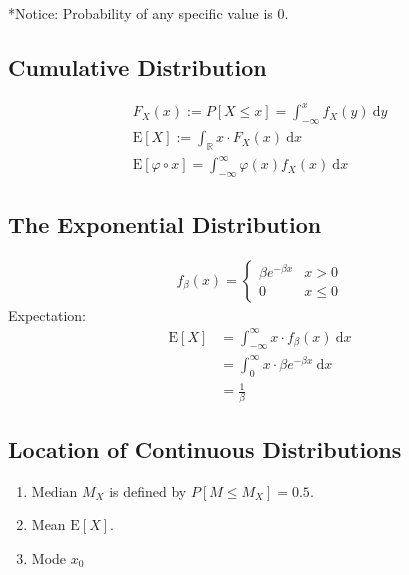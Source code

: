 \documentclass[11pt,a4paper]{article}
\newcommand{\dd}{\mathrm{d}}
\newcommand{\dx}{\dd x}
\newcommand{\dy}{\dd y}
\begin{document}
*Notice: Probability of any specific value is 0.
\subsection{Cumulative Distribution}
\begin{gather}
    F_X(x):=P[X\le x]=\int_{-\infty}^{x}f_X(y)\ \dy\\
    \mathrm{E}[X]:=\int_\mathbb{R}x\cdot F_X(x)\ \dx\\
    \mathrm{E}[\varphi \circ x] = \int^\infty_{-\infty}\varphi(x)f_X(x)\ \dx
\end{gather}

\subsection{The Exponential Distribution}
\begin{gather}
    f_\beta(x) = \begin{cases}
        \beta e^{-\beta x} & x>0   \\
        0                  & x\le0
    \end{cases}
\end{gather}
Expectation:
\begin{align*}
    \mathrm{E}[X] & = \int_{-\infty}^{\infty}x\cdot f_\beta(x)\ \dx   \\
                  & = \int_{0}^{\infty}x\cdot \beta e^{-\beta x}\ \dx \\
                  & = \frac{1}{\beta}
\end{align*}

\subsection{Location of Continuous Distributions}
\begin{enumerate}
    \item Median $M_X$ is defined by $P[M\le M_X]=0.5$.
    \item Mean $\mathrm{E}[X]$.
    \item Mode $x_0$
\end{enumerate}
\end{document}
